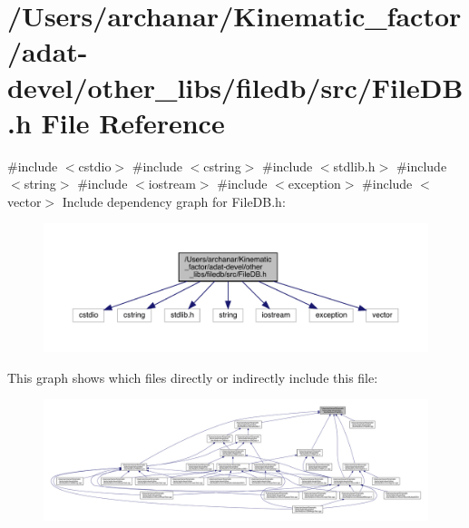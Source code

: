 \hypertarget{adat-devel_2other__libs_2filedb_2src_2FileDB_8h}{}\section{/\+Users/archanar/\+Kinematic\+\_\+factor/adat-\/devel/other\+\_\+libs/filedb/src/\+File\+DB.h File Reference}
\label{adat-devel_2other__libs_2filedb_2src_2FileDB_8h}
{\ttfamily \#include $<$cstdio$>$}\newline
{\ttfamily \#include $<$cstring$>$}\newline
{\ttfamily \#include $<$stdlib.\+h$>$}\newline
{\ttfamily \#include $<$string$>$}\newline
{\ttfamily \#include $<$iostream$>$}\newline
{\ttfamily \#include $<$exception$>$}\newline
{\ttfamily \#include $<$vector$>$}\newline
Include dependency graph for File\+D\+B.\+h\+:
\nopagebreak
\begin{figure}[H]
\begin{center}
\leavevmode
\includegraphics[width=350pt]{d3/dc1/adat-devel_2other__libs_2filedb_2src_2FileDB_8h__incl}
\end{center}
\end{figure}
This graph shows which files directly or indirectly include this file\+:
\nopagebreak
\begin{figure}[H]
\begin{center}
\leavevmode
\includegraphics[width=350pt]{d8/d50/adat-devel_2other__libs_2filedb_2src_2FileDB_8h__dep__incl}
\end{center}
\end{figure}
